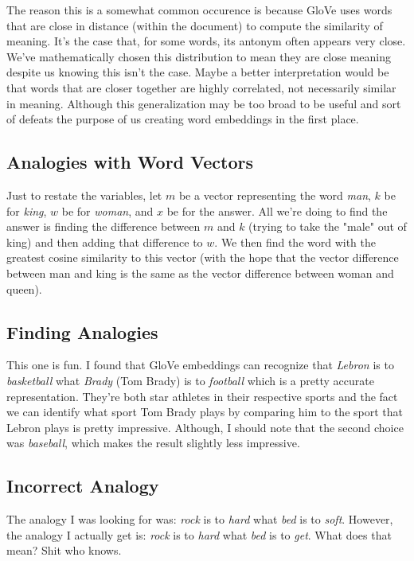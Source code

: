 \documentclass[12pt]{article}
\begin{document}
The reason this is a somewhat common occurence is because GloVe uses words that are close in distance 
(within the document) to compute the similarity of meaning. It's the case that, for some words, its antonym 
often appears very close. We've mathematically chosen this distribution to mean they are close meaning despite us knowing this isn't
the case. Maybe a better interpretation would be that words that are closer together are highly correlated, 
not necessarily similar in meaning. Although this generalization may be too broad to be useful and 
sort of defeats the purpose of us creating word embeddings in the first place. 

\subsection{Analogies with Word Vectors}
Just to restate the variables, let $m$ be a vector representing the word \emph{man}, $k$ be for 
\emph{king}, $w$ be for \emph{woman}, and $x$ be for the answer. All we're doing to find the answer
is finding the difference between $m$ and $k$ (trying to take the "male" out of king) and then adding
that difference to $w$. We then find the word with the greatest
cosine similarity to this vector (with the hope that the vector difference between man and king is the 
same as the vector difference between woman and queen). 

\subsection{Finding Analogies}
This one is fun. I found that GloVe embeddings can recognize that \emph{Lebron} is to \emph{basketball}
what \emph{Brady} (Tom Brady) is to \emph{football} which is a pretty accurate representation. They're 
both star athletes in their respective sports and the fact we can identify what sport Tom Brady plays 
by comparing him to the sport that Lebron plays is pretty impressive. Although, I should note 
that the second choice was \emph{baseball}, which makes the result slightly less impressive. 

\subsection{Incorrect Analogy}
The analogy I was looking for was: \emph{rock} is to \emph{hard} what \emph{bed} is to \emph{soft}. 
However, the analogy I actually get is: \emph{rock} is to \emph{hard} what \emph{bed} is to \emph{get}.
What does that mean? Shit who knows. 
\end{document}
